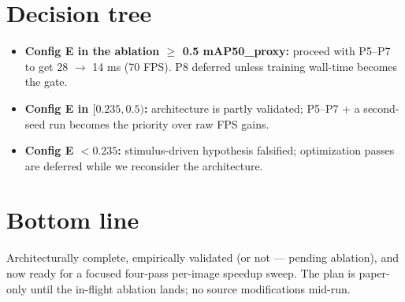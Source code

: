 \documentclass[11pt,a4paper]{article}
\begin{document}
\section{Decision tree}

\begin{itemize}
\item \textbf{Config E in the ablation $\geq$ 0.5 mAP50\_proxy:}
  proceed with P5--P7 to get 28 $\to$ 14 ms (70 FPS). P8 deferred
  unless training wall-time becomes the gate.
\item \textbf{Config E in $[0.235, 0.5)$:} architecture is partly
  validated; P5--P7 + a second-seed run becomes the priority over
  raw FPS gains.
\item \textbf{Config E $< 0.235$:} stimulus-driven hypothesis
  falsified; optimization passes are deferred while we
  reconsider the architecture.
\end{itemize}

\section{Bottom line}

Architecturally complete, empirically validated (or not — pending
ablation), and now ready for a focused four-pass per-image
speedup sweep. The plan is paper-only until the in-flight
ablation lands; no source modifications mid-run.
\end{document}
